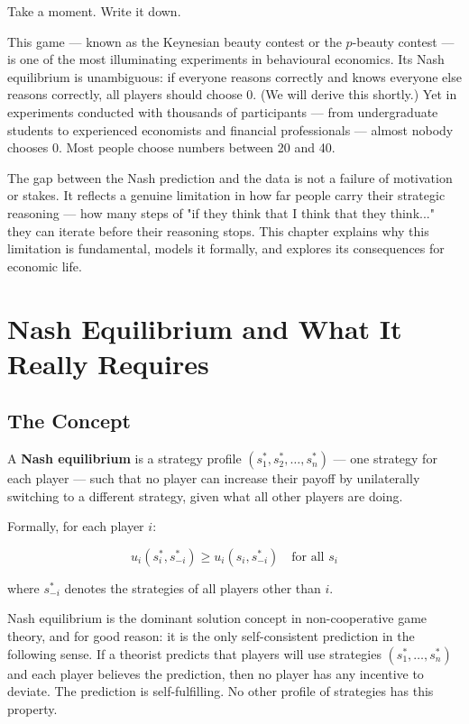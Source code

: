 \documentclass[12pt, letterpaper]{article}
\begin{document}
Take a moment. Write it down.

This game --- known as the Keynesian beauty contest or the $p$-beauty contest --- is one of the most illuminating experiments in behavioural economics. Its Nash equilibrium is unambiguous: if everyone reasons correctly and knows everyone else reasons correctly, all players should choose 0. (We will derive this shortly.) Yet in experiments conducted with thousands of participants --- from undergraduate students to experienced economists and financial professionals --- almost nobody chooses 0. Most people choose numbers between 20 and 40.

The gap between the Nash prediction and the data is not a failure of motivation or stakes. It reflects a genuine limitation in how far people carry their strategic reasoning --- how many steps of "if they think that I think that they think..." they can iterate before their reasoning stops. This chapter explains why this limitation is fundamental, models it formally, and explores its consequences for economic life.

\medskip


\section{Nash Equilibrium and What It Really Requires}



\subsection{The Concept}


A \textbf{Nash equilibrium} is a strategy profile $(s_1^*, s_2^*, \ldots, s_n^*)$ --- one strategy for each player --- such that no player can increase their payoff by unilaterally switching to a different strategy, given what all other players are doing.

Formally, for each player $i$:

$$u_i(s_i^*, s_{-i}^*) \geq u_i(s_i, s_{-i}^*) \quad \text{for all } s_i$$

where $s_{-i}^*$ denotes the strategies of all players other than $i$.

Nash equilibrium is the dominant solution concept in non-cooperative game theory, and for good reason: it is the only self-consistent prediction in the following sense. If a theorist predicts that players will use strategies $(s_1^*, \ldots, s_n^*)$ and each player believes the prediction, then no player has any incentive to deviate. The prediction is self-fulfilling. No other profile of strategies has this property.
\end{document}
